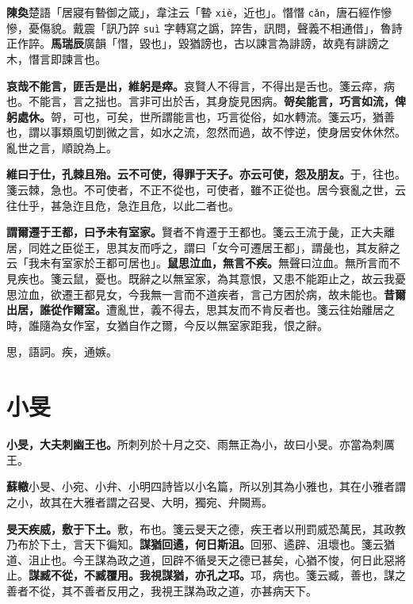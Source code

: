 \begin{quoting}\textbf{陳奐}楚語「居寢有暬御之箴」，韋注云「暬 \texttt{xiè}，近也」。憯憯 \texttt{cǎn}，唐石經作慘慘，憂傷貌。戴震「訊乃誶 \texttt{suì} 字轉寫之譌，誶吿，訊問，聲義不相通借」，魯詩正作誶。\textbf{馬瑞辰}廣韻「憯，毀也」，毀猶謗也，古以諫言為誹謗，故堯有誹謗之木，憯言即諫言也。\end{quoting}

\textbf{哀哉不能言，匪舌是出，維躬是瘁。}{\footnotesize 哀賢人不得言，不得出是舌也。箋云瘁，病也。不能言，言之拙也。言非可出於舌，其身旋見困病。}\textbf{哿矣能言，巧言如流，俾躬處休。}{\footnotesize 哿，可也，可矣，世所謂能言也，巧言從俗，如水轉流。箋云巧，猶善也，謂以事類風切剴微之言，如水之流，忽然而過，故不悖逆，使身居安休休然。亂世之言，順說為上。}

\textbf{維曰于仕，孔棘且殆。云不可使，得罪于天子。亦云可使，怨及朋友。}{\footnotesize 于，往也。箋云棘，急也。不可使者，不正不從也，可使者，雖不正從也。居今衰亂之世，云往仕乎，甚急迮且危，急迮且危，以此二者也。}

\textbf{謂爾遷于王都，曰予未有室家。}{\footnotesize 賢者不肯遷于王都也。箋云王流于彘，正大夫離居，同姓之臣從王，思其友而呼之，謂曰「女今可遷居王都」，謂彘也，其友辭之云「我未有室家於王都可居也」。}\textbf{鼠思泣血，無言不疾。}{\footnotesize 無聲曰泣血。無所言而不見疾也。箋云鼠，憂也。既辭之以無室家，為其意恨，又患不能距止之，故云我憂思泣血，欲遷王都見女，今我無一言而不道疾者，言己方困於病，故未能也。}\textbf{昔爾出居，誰從作爾室。}{\footnotesize 遭亂世，義不得去，思其友而不肯反者也。箋云往始離居之時，誰隨為女作室，女猶自作之爾，今反以無室家距我，恨之辭。}

\begin{quoting}思，語詞。疾，通嫉。\end{quoting}

\section{小旻}


\textbf{小旻，大夫刺幽王也。}{\footnotesize 所刺列於十月之交、雨無正為小，故曰小旻。亦當為刺厲王。}

\begin{quoting}\textbf{蘇轍}小旻、小宛、小弁、小明四詩皆以小名篇，所以別其為小雅也，其在小雅者謂之小，故其在大雅者謂之召旻、大明，獨宛、弁闕焉。\end{quoting}

\textbf{旻天疾威，敷于下土。}{\footnotesize 敷，布也。箋云旻天之德，疾王者以刑罰威恐萬民，其政教乃布於下土，言天下徧知。}\textbf{謀猶回遹，何日斯沮。}{\footnotesize 回邪、遹辟、沮壞也。箋云猶道、沮止也。今王謀為政之道，回辟不循旻天之德已甚矣，心猶不悛，何日此惡將止。}\textbf{謀臧不從，不臧覆用。我視謀猶，亦孔之邛。}{\footnotesize 邛，病也。箋云臧，善也，謀之善者不從，其不善者反用之，我視王謀為政之道，亦甚病天下。}

